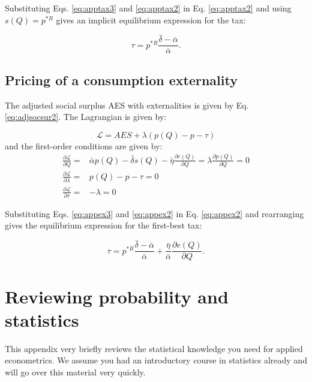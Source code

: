 \documentclass[
]{book}
\begin{document}
Substituting Eqs. \eqref{eq:apptax3} and \eqref{eq:apptax2} in Eq. \eqref{eq:apptax2} and using \(s(Q)=p^{*R}\) gives an implicit equilibrium expression for the tax:

\begin{equation}
 \tau = p^{*R} \frac{\bar{\delta} - \bar{\alpha}}{\bar{\alpha}}.
\end{equation}

\hypertarget{apppricing}{%
\section{Pricing of a consumption externality}\label{apppricing}}

The adjusted social surplus AES with externalities is given by Eq. \eqref{eq:adjsocsur2}. The Lagrangian is given by:

\begin{equation}
\mathcal{L} = AES  + \lambda(p(Q) - p - \tau)
\end{equation}
and the first-order conditions are given by:
\begin{align}
  \frac{\partial \mathcal{L}}{\partial Q} =& \bar{\alpha} p(Q) - \bar{\delta} s(Q) - \bar{\eta}\frac{\partial e(Q)}{\partial Q} = \lambda \frac{\partial p(Q)}{\partial Q} = 0 \label{eq:appex1}\\
  \frac{\partial \mathcal{L}}{\partial \lambda} =& p(Q) - p - \tau = 0 \label{eq:appex2}\\
  \frac{\partial \mathcal{L}}{\partial \tau} =& - \lambda = 0 \label{eq:appex3}
\end{align}

Substituting Eqs. \eqref{eq:appex3} and \eqref{eq:appex2} in Eq. \eqref{eq:appex2} and rearranging gives the equilibrium expression for the first-best tax:

\begin{equation}
 \tau = p^{*R} \frac{\bar{\delta} - \bar{\alpha}}{\bar{\alpha}} + \frac{\bar{\eta}}{\bar{\alpha}}\frac{\partial e(Q)}{\partial Q}.
\end{equation}

\hypertarget{appreviewstat}{%
\chapter{Reviewing probability and statistics}\label{appreviewstat}}

This appendix very briefly reviews the statistical knowledge you need for applied econometrics. We assume you had an introductory course in statistics already and will go over this material very quickly.
\end{document}
